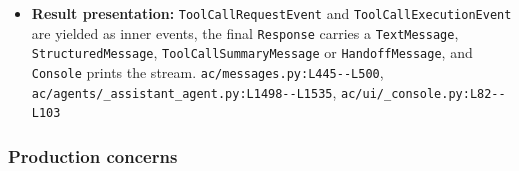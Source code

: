 \begin{itemize}
\item \textbf{Result presentation:} \texttt{ToolCallRequestEvent} and \texttt{ToolCallExecutionEvent} are yielded as inner events, the final \texttt{Response} carries a \texttt{TextMessage}, \texttt{StructuredMessage}, \texttt{ToolCallSummaryMessage} or \texttt{HandoffMessage}, and \texttt{Console} prints the stream. \texttt{ac/\allowbreak{}messages.\allowbreak{}py:\allowbreak{}L445-\allowbreak{}-\allowbreak{}L500}, \texttt{ac/\allowbreak{}agents/\allowbreak{}\_\allowbreak{}assistant\_\allowbreak{}agent.\allowbreak{}py:\allowbreak{}L1498-\allowbreak{}-\allowbreak{}L1535}, \texttt{ac/\allowbreak{}ui/\allowbreak{}\_\allowbreak{}console.\allowbreak{}py:\allowbreak{}L82-\allowbreak{}-\allowbreak{}L103}
\end{itemize}

\subsubsection*{Production concerns}
